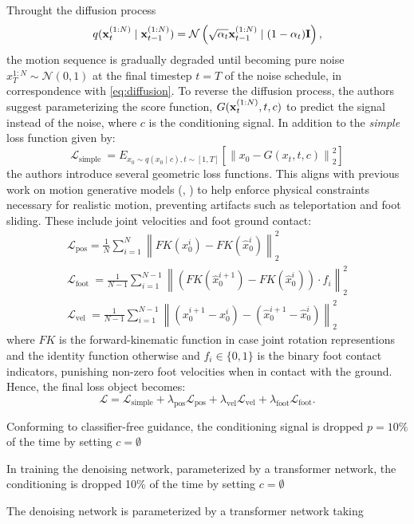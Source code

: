 Throught the diffusion process
\begin{equation}
    q(\boldsymbol{\mathbf{x}}_t^{(1:N)} \mid \boldsymbol{\mathbf{x}}_{t-1}^{(1:N)}) = \mathcal{N}\left( \sqrt{\alpha_t} \boldsymbol{\mathbf{x}}_{t-1}^{(1:N)} \mid (1 - \alpha_t) \boldsymbol{\mathbf{I}} \right),
\end{equation} 
the motion sequence is gradually degraded until becoming pure noise $x_T^{1:N} \sim \mathcal{N}(0, 1)$ at the final timestep $t=T$ of the noise schedule, in correspondence with \cref{eq:diffusion}. To reverse the diffusion process, the authors suggest parameterizing the score function, $G(\boldsymbol{\mathbf{x}}_t^{(1:N)}, t, c)$ to predict the signal instead of the noise, where $c$ is the conditioning signal. In addition to the \textit{simple} loss function given by:
\begin{equation}
    \mathcal{L}_{\text {simple }}=E_{x_0 \sim q\left(x_0 \mid c\right), t \sim[1, T]}\left[\left\|x_0-G\left(x_t, t, c\right)\right\|_2^2\right]
\end{equation}
the authors introduce several geometric loss functions. This aligns with previous work on motion generative models (\cite{petrovich2021actionconditioned3dhumanmotion}, \cite{Shi_2020}) to help enforce physical constraints necessary for realistic motion, preventing artifacts such as teleportation and foot sliding. These include joint velocities and foot ground contact:
\begin{equation}
    \begin{gathered}
        \mathcal{L}_{\mathrm{pos}}=\frac{1}{N} \sum_{i=1}^N\left\|F K\left(x_0^i\right)-F K\left(\hat{x}_0^i\right)\right\|_2^2 \\
        \mathcal{L}_{\text {foot }}=\frac{1}{N-1} \sum_{i=1}^{N-1}\left\|\left(F K\left(\hat{x}_0^{i+1}\right)-F K\left(\hat{x}_0^i\right)\right) \cdot f_i\right\|_2^2 \\
        \mathcal{L}_{\text {vel }}=\frac{1}{N-1} \sum_{i=1}^{N-1}\left\|\left(x_0^{i+1}-x_0^i\right)-\left(\hat{x}_0^{i+1}-\hat{x}_0^i\right)\right\|_2^2
    \end{gathered}
\end{equation}
where $FK$ is the forward-kinematic function in case joint rotation representions and the identity function otherwise and $f_i \in \{ 0, 1 \}$ is the binary foot contact indicators, punishing non-zero foot velocities when in contact with the ground. Hence, the final loss object becomes:
\begin{equation}
    \mathcal{L} = \mathcal{L}_\text{simple} + \lambda_\text{pos} \mathcal{L}_\text{pos} + \lambda_\text{vel} \mathcal{L}_\text{vel} + \lambda_\text{foot} \mathcal{L}_\text{foot}.
\end{equation}


Conforming to classifier-free guidance, the conditioning signal is dropped $p=10\%$ of the time by setting $c=\emptyset$ 



In training the denoising network, parameterized by a transformer network, the conditioning is dropped 10\% of the time by setting $c=\emptyset$ 




The denoising network is parameterized by a transformer network taking 
